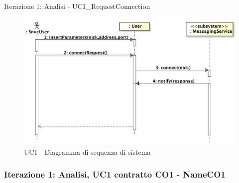 \documentclass[t]{beamer} %
\begin{document}
\begin{frame} {Iterazione 1: Analisi - UC1\_RequestConnection}
   \begin{figure}
     \includegraphics[scale=0.27]{image_astah/Iteration_1_DomainModel/UC1_RequestConnection_SSD.png}{\centering}
     \caption{UC1 - Diagramma di sequenza di sistema}
     \label{fig_UC1_RC_SSD} 
   \end{figure}
\end{frame}

\begin{frame}
 \frametitle{Iterazione 1: Analisi, UC1 contratto CO1 - NameCO1}
  \begin{table}[!htbp]
   \caption {UC1 Contratto CO1 - NameCO1}
    \label{table:1}
   \end{table}
\end{frame}
\end{document}

